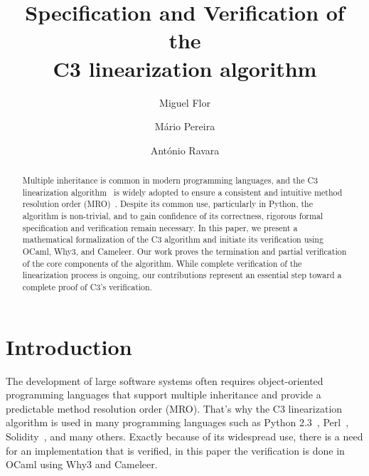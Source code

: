 \documentclass[runningheads]{llncs}
\title{Specification and Verification of the\\ C3 linearization algorithm}
\author{
  Miguel Flor \and Mário Pereira \and António Ravara
}
\institute{
  NOVA LINCS, Nova School of Science and Technology \\
  \email{m.flor@campus.fct.unl.pt}, \email{\{mjp.pereira, aravara\}@fct.unl.pt}
}
\begin{document}
\maketitle

\begin{abstract}
Multiple inheritance is common in modern programming languages,
 and the C3 linearization algorithm~\autocite{barrettMonotonicSuperclassLinearization1996} is widely adopted to ensure a consistent and intuitive method resolution order (MRO)~\autocite{MroMethodResolution}. Despite its common use, particularly in Python, the algorithm is non-trivial, and to gain confidence of its correctness, rigorous formal specification and verification remain necessary.
In this paper, we present a mathematical formalization of the C3 algorithm and initiate its verification using OCaml, Why3, and Cameleer. Our work proves the termination and partial verification of the core components of the algorithm.
While complete verification of the linearization process is ongoing, our contributions represent an essential step toward a complete proof of C3's verification.
\end{abstract}
\section{Introduction}
The development of large software systems often requires object-oriented programming languages that support multiple inheritance and provide a predictable method resolution order (MRO). 
 That's why the C3 linearization algorithm is used in many programming languages such as Python 2.3~\autocite{Python23Method}, Perl~\autocite{MroMethodResolution}, Solidity~\autocite{LanguageInfluencesSolidity}, and many others.
 Exactly because of its widespread use, there is a need for an implementation that is verified, in this paper the verification is done in OCaml using Why3 and Cameleer.
\end{document}
